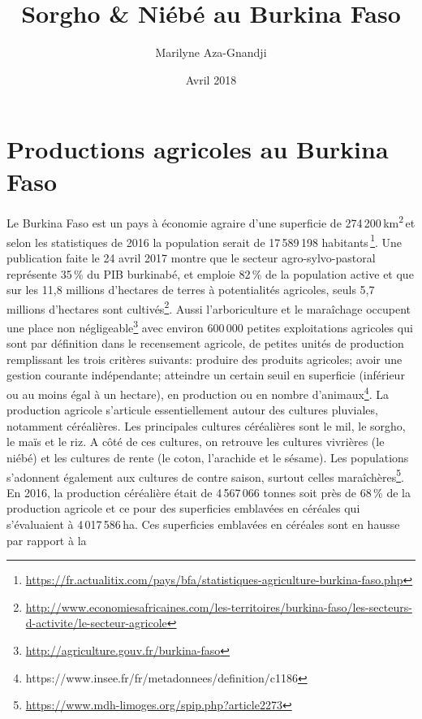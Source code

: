 \documentclass[a4paper,11pt]{article}
\begin{document}
\title{Sorgho \& Niébé au Burkina Faso}
\author{Marilyne Aza-Gnandji}
\date{Avril 2018} 

\maketitle
\tableofcontents

\section{Productions agricoles au Burkina Faso}

Le Burkina Faso est un pays à économie agraire
\cite{Koulibi_FideleZONGO} d'une superficie de
274\,200\,km\textsuperscript{2}\,et selon les statistiques de 2016 la
population serait de 17\,589\,198
habitants\,\footnote{\url{https://fr.actualitix.com/pays/bfa/statistiques-agriculture-burkina-faso.php}}. Une
publication faite le 24 avril 2017 montre que le secteur
agro-sylvo-pastoral représente 35\,\% du PIB burkinabé, et emploie
82\,\% de la population active et que sur les 11,8 millions d'hectares
de terres à potentialités agricoles, seuls 5,7 millions d'hectares
sont
cultivés\footnote{\url{http://www.economiesafricaines.com/les-territoires/burkina-faso/les-secteurs-d-activite/le-secteur-agricole}}. Aussi
l'arboriculture et le maraîchage occupent une place non
négligeable\footnote{\url{http://agriculture.gouv.fr/burkina-faso}}
avec environ 600\,000 petites exploitations agricoles qui sont par
définition dans le recensement agricole, de petites unités de
production remplissant les trois critères suivants: produire des
produits agricoles; avoir une gestion courante indépendante; atteindre
un certain seuil en superficie (inférieur ou au moins égal à un
hectare), en production ou en nombre
d'animaux\footnote{https://www.insee.fr/fr/metadonnees/definition/c1186}. La
production agricole s'articule essentiellement autour des cultures
pluviales, notamment céréalières. Les principales cultures céréalières
sont le mil, le sorgho, le maïs et le riz. A côté de ces cultures, on
retrouve les cultures vivrières (le niébé) et les cultures de rente
(le coton, l'arachide et le sésame). Les populations s'adonnent
également aux cultures de contre saison, surtout celles
maraîchères\footnote{\url{https://www.mdh-limoges.org/spip.php?article2273}}.
En 2016, la production céréalière était de 4\,567\,066 tonnes soit
près de 68\,\% de la production agricole et ce pour des superficies
emblavées en céréales qui s'évaluaient à 4\,017\,586\,ha. Ces
superficies emblavées en céréales sont en hausse par rapport à la
\end{document}
